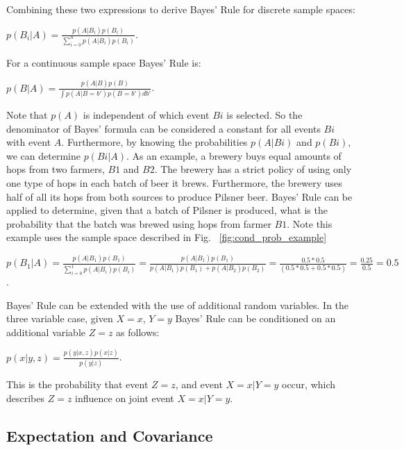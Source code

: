 \documentclass[twoside]{article}
\begin{document}
Combining these two expressions to derive Bayes' Rule for discrete sample spaces:

\begin{center}
$p(B_i|A)= \frac{p(A|B_i)p(B_i)}{\sum\limits_{i = 0}^{n} p(A|B_i)p(B_i)}$.
\end{center}

For a continuous sample space Bayes' Rule is:

\begin{center}
$p(B|A)= \frac{p(A|B)p(B)}{\int p(A|B = b')p(B = b')db'}$.
\end{center}

Note that $p(A)$ is independent of which event $Bi$ is selected. So the denominator of Bayes' formula can be considered a constant for all events $Bi$ with event $A$. Furthermore, by knowing the probabilities $p(A|Bi)$ and $p(Bi)$, we can determine $p(Bi|A)$. As an example, a brewery buys equal amounts of hops from two farmers, $B1$ and $B2$. The brewery has a strict policy of using only one type of hops in each batch of beer it brews. Furthermore, the brewery uses half of all its hops from both sources to produce Pilsner beer. Bayes' Rule can be applied to determine, given that a batch of Pilsner is produced, what is the probability that the batch was brewed using hops from farmer $B1$. Note this example uses the sample space described in Fig. ~\ref{fig:cond_prob_example}\ 

\begin{center}
$p(B_1|A)= \frac{p(A|B_1)p(B_1)}{\sum\limits_{i = 0}^{1} p(A|B_i)p(B_i)} = \frac{p(A|B_1)p(B_1)}{p(A|B_1)p(B_1) + p(A|B_2)p(B_2)} = \frac{0.5*0.5}{(0.5*0.5 + 0.5*0.5)} = \frac{0.25}{0.5} = 0.5$.
\end{center}

Bayes' Rule can be extended with the use of additional random variables. In the three variable case, given $X=x$, $Y=y$ Bayes' Rule can be conditioned on an additional variable $Z=z$ as follows:

\begin{center}
$p(x|y, z)= \frac{p(y|x,z)p(x|z)}{p(y|z)}$.
\end{center}

This is the probability that event $Z=z$, and event $X=x|Y=y$ occur, which describes $Z=z$ influence on joint event $X=x|Y=y$.  

\subsection{Expectation and Covariance}
\end{document}
